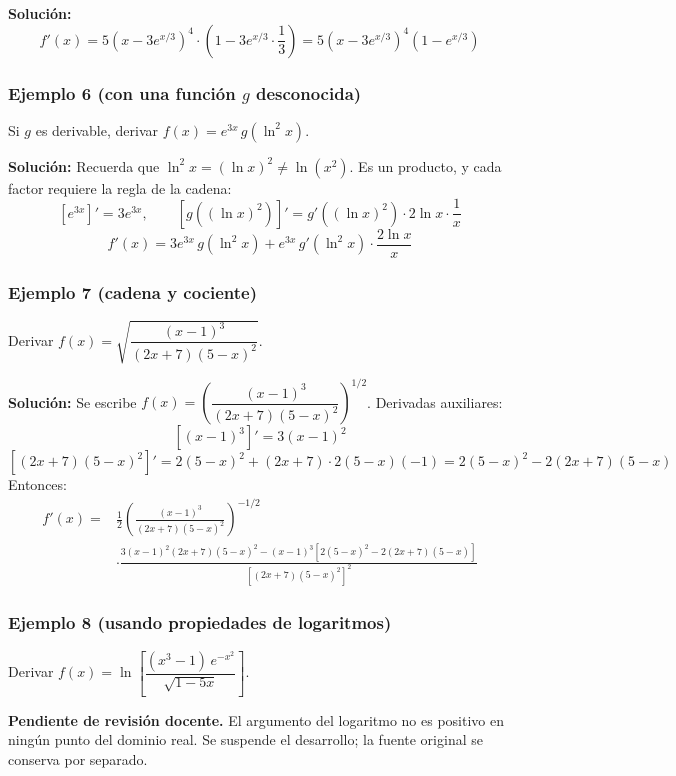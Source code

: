 \documentclass[12pt]{article}
\begin{document}
\textbf{Solución:}
\[
f'(x) = 5\left(x - 3e^{x/3}\right)^4 \cdot \left(1 - 3e^{x/3} \cdot \frac{1}{3}\right) = 5\left(x - 3e^{x/3}\right)^4 \left(1 - e^{x/3}\right)
\]



\subsubsection{Ejemplo 6 (con una función $g$ desconocida)}


Si $g$ es derivable, derivar $f(x) = e^{3x} \, g(\ln^2 x)$.

\textbf{Solución:} Recuerda que $\ln^2 x = (\ln x)^2 \neq \ln(x^2)$. Es un producto, y cada factor requiere la regla de la cadena:
\[
\left[e^{3x}\right]' = 3e^{3x}, \qquad \left[g\left((\ln x)^2\right)\right]' = g'\left((\ln x)^2\right) \cdot 2\ln x \cdot \frac{1}{x}
\]
\[
f'(x) = 3e^{3x} \, g(\ln^2 x) + e^{3x} \, g'(\ln^2 x) \cdot \frac{2\ln x}{x}
\]



\subsubsection{Ejemplo 7 (cadena y cociente)}


Derivar $f(x) = \sqrt{\dfrac{(x - 1)^3}{(2x + 7)(5 - x)^2}}$.

\textbf{Solución:} Se escribe $f(x) = \left(\dfrac{(x - 1)^3}{(2x + 7)(5 - x)^2}\right)^{1/2}$. Derivadas auxiliares:
\[
\left[(x - 1)^3\right]' = 3(x - 1)^2
\]
\[
\left[(2x + 7)(5 - x)^2\right]' = 2(5 - x)^2 + (2x + 7) \cdot 2(5 - x)(-1) = 2(5 - x)^2 - 2(2x + 7)(5 - x)
\]
Entonces:
\begin{align*}
f'(x) = {} & \frac{1}{2}\left(\frac{(x - 1)^3}{(2x + 7)(5 - x)^2}\right)^{-1/2} \\
& \cdot \frac{3(x - 1)^2 (2x + 7)(5 - x)^2 - (x - 1)^3\left[2(5 - x)^2 - 2(2x + 7)(5 - x)\right]}{\left[(2x + 7)(5 - x)^2\right]^2}
\end{align*}



\subsubsection{Ejemplo 8 (usando propiedades de logaritmos)}


Derivar $f(x) = \ln\left[\dfrac{(x^3 - 1)\,e^{-x^2}}{\sqrt{1 - 5x}}\right]$.

\textbf{Pendiente de revisión docente.} El argumento del logaritmo no es positivo en ningún punto del dominio real. Se suspende el desarrollo; la fuente original se conserva por separado.
\end{document}
